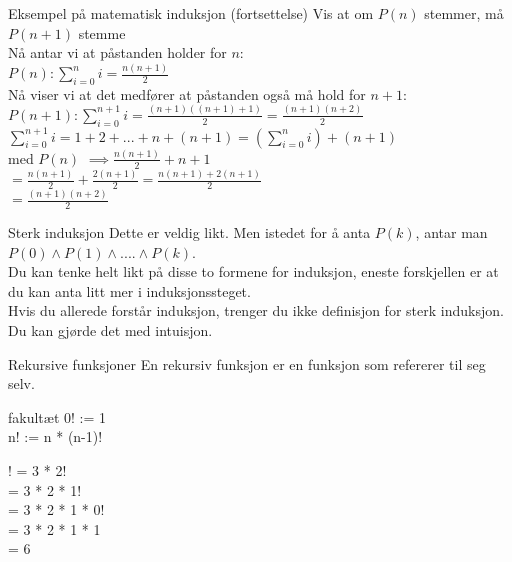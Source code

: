 \begin{frame}{Eksempel på matematisk induksjon (fortsettelse)}
    Vis at om $P(n)$ stemmer, må $P(n+1)$ stemme\\
    Nå antar vi at påstanden holder for $n$: \\
    $P(n): \sum_{i=0}^{n} i = \frac{n(n+1)}{2}$\\
    Nå viser vi at det medfører at påstanden også må hold for $n+1$:\\
    $P(n+1): \sum_{i=0}^{n+1} i = \frac{(n+1)((n+1)+1)}{2} = \frac{(n+1)(n+2)}{2}$\\

    $\sum_{i=0}^{n+1} i =1 + 2 + ... + n + (n+1) = (\sum_{i=0}^{n} i )+ (n+1)$\\
\pause
    med $P(n)$ $\implies \frac{n(n+1)}{2} + n + 1$\\
    $ = \frac{n(n+1)}{2}+\frac{2(n+1)}{2} = \frac{n(n+1)+2(n+1)}{2}$\\
    $ = \frac{(n+1)(n+2)}{2}$ \checkmark
\end{frame}

\begin{frame}{Sterk induksjon}
    Dette er veldig likt. Men istedet for å anta $P(k)$, antar man $P(0) \land P(1) \land .... \land P(k)$.\\
    Du kan tenke helt likt på disse to formene for induksjon, eneste forskjellen er at du kan anta litt mer i induksjonssteget.\\

    Hvis du allerede forstår induksjon, trenger du ikke definisjon for sterk induksjon. Du kan gjørde det med intuisjon.
\end{frame}

\begin{frame}{Rekursive funksjoner}
    En rekursiv funksjon er en funksjon som refererer til seg selv.
    \pause
    \begin{block}{fakultæt}
        0! := 1 \\
        n! := n * (n-1)!\\
    \end{block}    
    ! = 3 * 2!\\
     = 3 * 2 * 1!\\
     = 3 * 2 * 1 * 0!\\
     = 3 * 2 * 1 * 1\\
     = 6
\end{frame}

